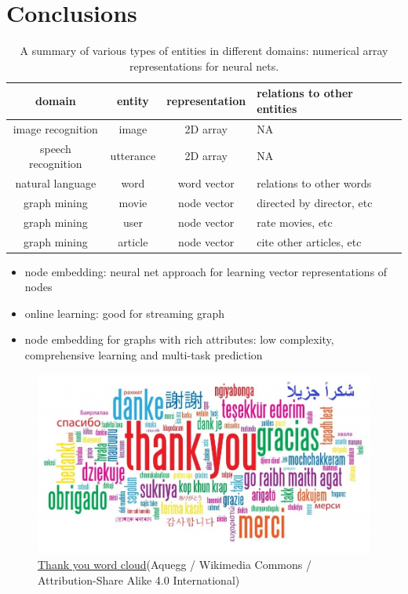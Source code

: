 \documentclass{article}
\begin{document}
\section{Conclusions}
\begin{table}[H]
	\centering
	\begin{tabularx}{\textwidth}{ |c|c|c|X| }
		\hline domain & entity & representation & relations to other entities \\ 
		\hline image recognition & image & 2D array & NA \\ 
		\hline speech recognition & utterance & 2D array & NA \\ 
		\hline natural language & word & word vector & relations to other words \\ 
		\hline graph mining & movie & node vector & directed by director, etc \\ 
		\hline graph mining & user & node vector & rate movies, etc \\ 
		\hline graph mining & article & node vector & cite other articles, etc \\
		\hline
	\end{tabularx}
	\caption{A summary of various types of entities in different domains: numerical array representations for neural nets.}
	\label{tab:domains}
\end{table}
\begin{itemize}
	\item node embedding: neural net approach for learning vector representations of nodes
	\item online learning: good for streaming graph
	\item node embedding for graphs with rich attributes: low complexity, comprehensive learning and multi-task prediction
\end{itemize}
\begin{figure}[H]
	\centering
	\includegraphics[width=\linewidth]{Thank-you-word-cloud}
	\caption{ \href{https://commons.wikimedia.org/wiki/File:Spectrogram-19thC.png}{Thank you word cloud}(Aquegg / Wikimedia Commons / Attribution-Share Alike 4.0 International)}
	\label{fig:Thank-you-word-cloud}
\end{figure}
\end{document}
